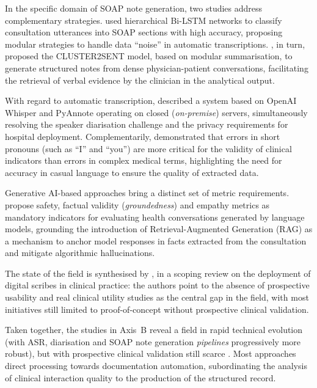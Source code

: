 \documentclass[review,12pt]{elsarticle}
\begin{document}
In the specific domain of SOAP note generation, two studies address
complementary strategies. \citet{Schloss2020} used hierarchical Bi-LSTM
networks to classify consultation utterances into SOAP sections with high
accuracy, proposing modular strategies to handle data ``noise'' in automatic
transcriptions. \citet{Krishna2021}, in turn, proposed the CLUSTER2SENT
model, based on modular summarisation, to generate structured notes from
dense physician-patient conversations, facilitating the retrieval of verbal
evidence by the clinician in the analytical output.

With regard to automatic transcription, \citet{Klusty2025} described a system
based on OpenAI Whisper and PyAnnote operating on closed (\textit{on-premise})
servers, simultaneously resolving the speaker diarisation challenge and the
privacy requirements for hospital deployment. Complementarily,
\citet{Tran2023} demonstrated that errors in short pronouns (such as
\enquote{I} and \enquote{you}) are more critical for the validity of clinical
indicators than errors in complex medical terms, highlighting the need for
accuracy in casual language to ensure the quality of extracted data.

Generative AI-based approaches bring a distinct set of metric requirements.
\citet{Abbasian2024} propose safety, factual validity
(\textit{groundedness}) and empathy metrics as mandatory indicators for
evaluating health conversations generated by language models, grounding the
introduction of Retrieval-Augmented Generation (RAG) as a mechanism to anchor
model responses in facts extracted from the consultation and mitigate
algorithmic hallucinations.

The state of the field is synthesised by \citet{vanBuchem2021}, in a scoping
review on the deployment of digital scribes in clinical practice: the authors
point to the absence of prospective usability and real clinical utility studies
as the central gap in the field, with most initiatives still limited to
proof-of-concept without prospective clinical validation.

Taken together, the studies in Axis~B reveal a field in rapid technical
evolution (with ASR, diarisation and SOAP note generation \textit{pipelines}
progressively more robust), but with prospective clinical validation still
scarce \citep{vanBuchem2021}. Most approaches direct processing towards
documentation automation, subordinating the analysis of clinical interaction
quality to the production of the structured record.
\end{document}
